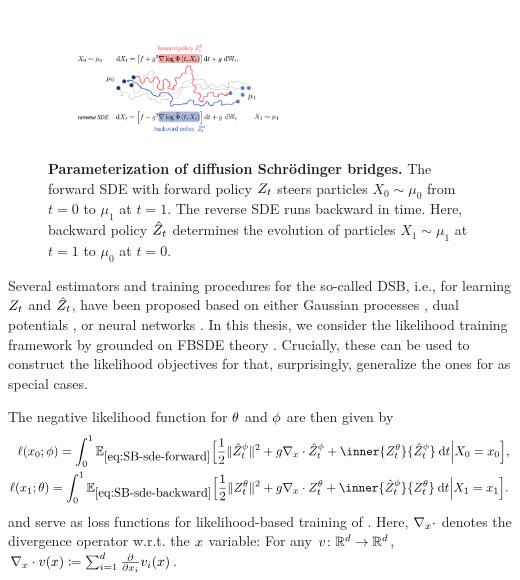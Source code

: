 \begin{figure}[t]
	\centering
	\includegraphics[width=0.8\textwidth]{figures/fig_principle_dsb.pdf}
	\caption{\textbf{Parameterization of diffusion Schr{\"o}dinger bridges.} The forward SDE with forward policy {\color{pink} $Z_t$} steers particles $X_0 \sim \mu_0$ from $t=0$ to $\mu_1$ at $t=1$. The reverse SDE runs backward in time. Here, backward policy {\color{blue} $\hat{Z}_t$} determines the evolution of particles $X_1 \sim \mu_1$ at $t=1$ to $\mu_0$ at $t=0$.} 
	\label{fig:principle_dsb}
\end{figure}

Several estimators and training procedures for the so-called \acrfull{DSB}, i.e., for learning $Z_t$ and $\hat{Z}_t$, have been proposed based on either Gaussian processes \citep{vargas2021solving}, dual potentials \citep{finlay2020learning}, or neural networks \citep{de2021diffusion, chen2021likelihood}.
In this thesis, we consider the likelihood training framework by \citet{chen2021likelihood} grounded on \acrfull{FBSDE} theory \citep{ma1999forward, exarchos2018stochastic}. Crucially, these  can be used to construct the likelihood objectives for  that, surprisingly, generalize the ones for  as special cases. 

The negative likelihood function for $\theta$ and $\phi$ are then given by
\begin{subequations}
\begin{align}
\lossb =  \int_0^\horizon \mathbb{E}_{\eqref{eq:SB-sde-forward}}\Big[ \frac{1}{2}\norm{\SBbbase^{\paramb}_\ctime}^2 &+\volatbase \Div \SBbbase^{\paramb}_\ctime+ \inner{\SBfbase^{\paramf}_\ctime}{\SBbbase^{\paramb}_\ctime} \dt \Big\vert \sde[0] = \point_0 \Big] ,  \\
\lossf =  \int_0^\horizon \mathbb{E}_{\eqref{eq:SB-sde-backward}}\Big[ \frac{1}{2}\norm{\SBfbase^{\paramf}_\ctime}^2 &+\volatbase \Div \SBfbase^{\paramf}_\ctime + \inner{\SBbbase^{\paramb}_\ctime}{\SBfbase^{\paramf}_\ctime} \dt \Big\vert \sde[\horizon] = \point_{\horizon} \Big].
\end{align}
\end{subequations}
and serve as loss functions for likelihood-based training of . Here, $\nabla_{ {x} } \cdot$ denotes the divergence operator w.r.t. the $x$ variable: For any $v\colon \mathbb{R}^d \to \mathbb{R}^d$, $\nabla_{ {x} } \cdot v(x) \coloneqq \sum_{i=1}^{d} \frac{\partial}{\partial x_{i} } v_i(x)$.


